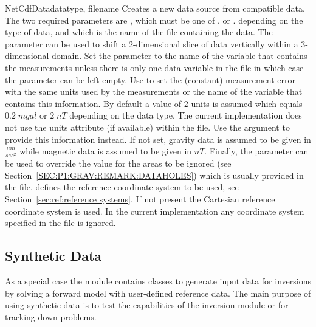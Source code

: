 \begin{classdesc}{NetCdfData}{datatype, filename%
%
%
%
%
}
Creates a new data source from compatible \netcdf data.
The two required parameters are , which must be one of
. or .
depending on the type of data, and  which is the name of the
file containing the data.
The  parameter can be used to shift a 2-dimensional slice of
data vertically within a 3-dimensional domain.
Set the  parameter to the name of the \netcdf variable
that contains the measurements unless there is only one data variable in the
file in which case the parameter can be left empty.
Use  to set the (constant) measurement error with the same units
used by the measurements or the name of the \netcdf variable that contains this
information. By default a value of $2$ units is assumed which equals
$0.2 \; mgal$ or $2 \; nT$ depending on the data type.
The current implementation does not use the units attribute (if available)
within the \netcdf file. Use the  argument to provide this
information instead.
If not set, gravity data is assumed to be given in $\frac{\mu m}{sec^2}$ while
magnetic data is assumed to be given in $nT$.
Finally, the  parameter can be used to override the value
for the areas to be ignored (see Section~\ref{SEC:P1:GRAV:REMARK:DATAHOLES})
which is usually provided in the \netcdf file.  defines the reference coordinate system to be used, see Section~\ref{sec:ref:reference systems}.
If not present the Cartesian reference coordinate system is used. In the current implementation any
coordinate system specified in the file is ignored.
\end{classdesc}

\subsection{Synthetic Data}
As a special case the  module contains
classes to generate input data for inversions by solving a forward model with
user-defined reference data.
The main purpose of using synthetic data is to test the capabilities of the
inversion module or for tracking down problems.

